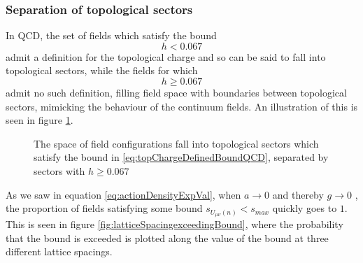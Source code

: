 \documentclass[a4paper,10pt]{article}
\begin{document}
\subsubsection{Separation of topological sectors}
In QCD, the set of fields which satisfy the bound \cite{PhillipsAnthony1986Lgfp}
\begin{equation}\label{eq:topChargeDefinedBoundQCD}
h<0.067
\end{equation}
admit a definition for the topological charge and so can be said to fall into topological sectors, while the fields for which 
\begin{equation}
h\geq 0.067
\end{equation}
admit no such definition, filling field space with boundaries between topological sectors, mimicking the behaviour of the continuum fields. An illustration of this is seen in figure \ref{fig:topologicalSectors_illustration}.
\begin{figure}[H]
\centering
{}
\caption[]{The space of field configurations fall into topological sectors which satisfy the bound in \eqref{eq:topChargeDefinedBoundQCD}, separated by sectors with $h\geq 0.067$}\label{fig:topologicalSectors_illustration}
\end{figure}

As we saw in equation \eqref{eq:actionDensityExpVal}, when $a\rightarrow 0$ and thereby $g\rightarrow 0$ , the proportion of fields satisfying some bound $s_{U_{\mu \nu}(n)}<s_{max}$ quickly goes to $1$. This is seen in figure \ref{fig:latticeSpacingexceedingBound}, where the probability that the bound is exceeded is plotted along the value of the bound at three different lattice spacings.
\end{document}
